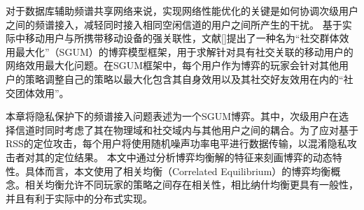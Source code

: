 对于数据库辅助频谱共享网络来说，实现网络性能优化的关键是如何协调次级用户之间的频谱接入，减轻同时接入相同空闲信道的用户之间所产生的干扰\cite{TII-game,TII-dynamic}。
基于实际中移动用户与所携带移动设备的强关联性，文献[]提出了一种名为“社交群体效用最大化”（SGUM）的博弈模型框架，用于求解针对具有社交关联的移动用户的网络效用最大化问题。在SGUM框架中，每个用户作为博弈的玩家会针对其他用户的策略调整自己的策略以最大化包含其自身效用以及其社交好友效用在内的“社交团体效用”。

本章将隐私保护下的频谱接入问题表述为一个SGUM博弈。其中，次级用户在选择信道时同时考虑了其在物理域和社交域内与其他用户之间的耦合。为了应对基于RSS的定位攻击，每个用户将使用随机噪声功率电平进行数据传输，以混淆隐私攻击者对其的定位结果。
本文中通过分析博弈均衡解的特征来刻画博弈的动态特性。具体而言，本文使用了相关均衡（Correlated Equilibrium）的博弈均衡概念。相关均衡允许不同玩家的策略之间存在相关性，相比纳什均衡更具有一般性，并且有利于实际中的分布式实现\cite{Lasaulce2011}。


